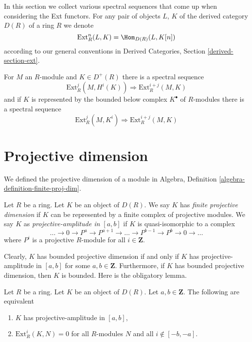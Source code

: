 \noindent
In this section we collect various spectral sequences that come up
when considering the Ext functors. For any pair of objects
$L$, $K$ of the derived category $D(R)$ of a ring $R$
we denote
$$
\text{Ext}^n_R(L, K) = \Hom_{D(R)}(L, K[n])
$$
according to our general conventions in
Derived Categories, Section \ref{derived-section-ext}.

\medskip\noindent
For $M$ an $R$-module and $K \in D^+(R)$ there is a spectral sequence
\begin{equation}
\label{equation-first-ss-ext}
\text{Ext}_R^j(M, H^i(K)) \Rightarrow \text{Ext}_R^{i + j}(M, K)
\end{equation}
and if $K$ is represented by the bounded below complex $K^\bullet$
of $R$-modules there is a spectral sequence
\begin{equation}
\label{equation-second-ss-ext}
\text{Ext}_R^j(M, K^i) \Rightarrow \text{Ext}_R^{i + j}(M, K)
\end{equation}




\section{Projective dimension}
\label{section-projective-dimension}

\noindent
We defined the projective dimension of a module in
Algebra, Definition \ref{algebra-definition-finite-proj-dim}.

\begin{definition}
\label{definition-projective-dimension}
Let $R$ be a ring. Let $K$ be an object of $D(R)$. We say $K$ has
{\it finite projective dimension} if $K$ can be represented by a
finite complex of projective modules. We say $K$ as
{\it projective-amplitude in $[a, b]$} if  $K$ is quasi-isomorphic
to a complex
$$
\ldots \to 0 \to P^a \to P^{a + 1} \to \ldots \to
P^{b - 1} \to P^b \to 0 \to \ldots
$$
where $P^i$ is a projective $R$-module for all $i \in \mathbf{Z}$.
\end{definition}

\noindent
Clearly, $K$ has bounded projective dimension if and only if $K$
has projective-amplitude in $[a, b]$ for some $a, b \in \mathbf{Z}$.
Furthermore, if $K$ has bounded projective dimension, then $K$
is bounded. Here is the obligatory lemma.

\begin{lemma}
\label{lemma-projective-amplitude}
Let $R$ be a ring. Let $K$ be an object of $D(R)$. Let $a, b \in \mathbf{Z}$.
The following are equivalent
\begin{enumerate}
\item $K$ has projective-amplitude in $[a, b]$,
\item $\text{Ext}^i_R(K, N) = 0$ for all $R$-modules $N$ and all
$i \not \in [-b, -a]$.
\end{enumerate}
\end{lemma}

